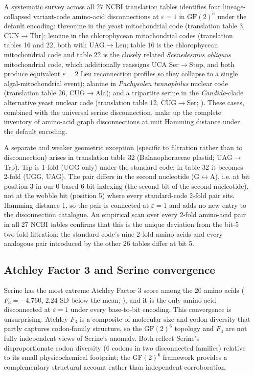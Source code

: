 \documentclass[preprint,11pt,authoryear,a4paper]{elsarticle}
\begin{document}
A systematic survey across all 27 NCBI translation tables identifies
four lineage-collapsed variant-code amino-acid disconnections at
\(\varepsilon = 1\) in \({\text{GF}(2)}^{6}\) under the default
encoding: threonine in the yeast mitochondrial code (translation table
3, CUN\(\rightarrow\)Thr); leucine in the chlorophycean mitochondrial
codes (translation tables 16 and 22, both with UAG\(\rightarrow\)Leu;
table 16 is the chlorophycean mitochondrial code \citep{hayashi1996} and
table 22 is the closely related \emph{Scenedesmus obliquus}
mitochondrial code, which additionally reassigns UCA
Ser\(\rightarrow\)Stop, and both produce equivalent \(\varepsilon = 2\)
Leu reconnection profiles so they collapse to a single
algal-mitochondrial event); alanine in \emph{Pachysolen tannophilus}
nuclear code (translation table 26, CUG\(\rightarrow\)Ala); and a
tripartite serine in the \emph{Candida}-clade alternative yeast nuclear
code (translation table 12, CUG\(\rightarrow\)Ser; \citep{santos1999}).
These cases, combined with the universal serine disconnection, make up
the complete inventory of amino-acid graph disconnections at unit
Hamming distance under the default encoding.

A separate and weaker geometric exception (specific to filtration rather
than to disconnection) arises in translation table 32 (Balanophoraceae
plastid; UAG\(\rightarrow\)Trp). Trp is 1-fold (UGG only) under the
standard code; in table 32 it becomes 2-fold (UGG, UAG). The pair
differs in the second nucleotide (G\(\leftrightarrow\)A), i.e. at bit
position 3 in our 0-based 6-bit indexing (the second bit of the second
nucleotide), not at the wobble bit (position 5) where every
standard-code 2-fold pair sits. Hamming distance 1, so the pair is
connected at \(\varepsilon = 1\) and adds no new entry to the
disconnection catalogue. An empirical scan over every 2-fold amino-acid
pair in all 27 NCBI tables confirms that this is the unique deviation
from the bit-5 two-fold filtration: the standard code's nine 2-fold
amino acids and every analogous pair introduced by the other 26 tables
differ at bit 5.

\subsection{Atchley Factor 3 and Serine
convergence}\label{sec:s-atchley}

Serine has the most extreme Atchley Factor 3 score among the 20 amino
acids (\(F_{3} = - 4.760\), 2.24 SD below the mean;
\citep{atchley2005}), and it is the only amino acid disconnected at
\(\varepsilon = 1\) under every base-to-bit encoding. This convergence
is unsurprising: Atchley \(F_{3}\) is a composite of molecular size and
codon diversity that partly captures codon-family structure, so the
\({\text{GF}(2)}^{6}\) topology and \(F_{3}\) are not fully independent
views of Serine's anomaly. Both reflect Serine's disproportionate codon
diversity (6 codons in two disconnected families) relative to its small
physicochemical footprint; the \({\text{GF}(2)}^{6}\) framework provides
a complementary structural account rather than independent
corroboration.
\end{document}
